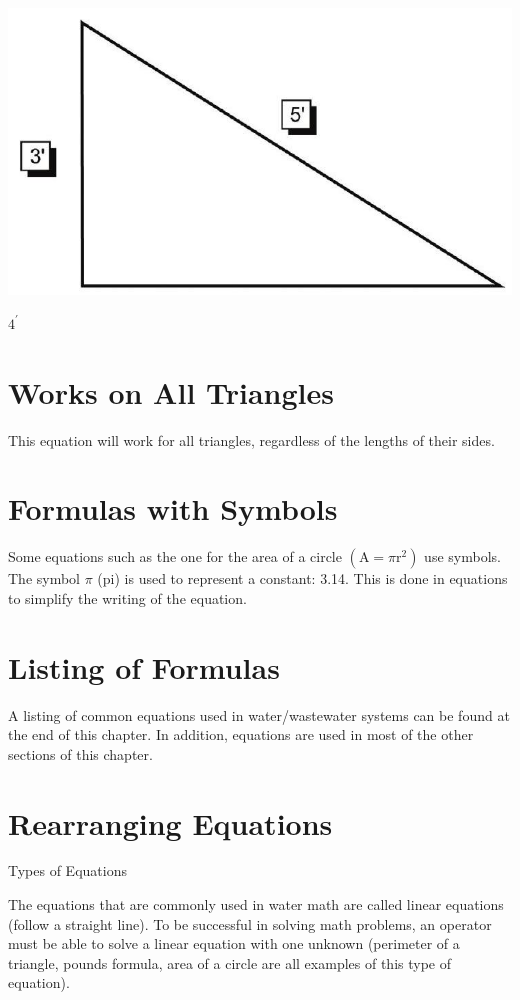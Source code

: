 \documentclass[10pt]{article}
\begin{document}
\includegraphics[max width=\textwidth]{2022_09_11_72dbedc910e6e984560cg-17(1)}

$4^{\prime}$

\section{Works on All Triangles}
This equation will work for all triangles, regardless of the lengths of their sides.

\section{Formulas with Symbols}
Some equations such as the one for the area of a circle $\left(\mathrm{A}=\pi \mathrm{r}^{2}\right)$ use symbols. The symbol $\pi$ (pi) is used to represent a constant: 3.14. This is done in equations to simplify the writing of the equation.

\section{Listing of Formulas}
A listing of common equations used in water/wastewater systems can be found at the end of this chapter. In addition, equations are used in most of the other sections of this chapter.

\section{Rearranging Equations}
Types of Equations

The equations that are commonly used in water math are called linear equations (follow a straight line). To be successful in solving math problems, an operator must be able to solve a linear equation with one unknown (perimeter of a triangle, pounds formula, area of a circle are all examples of this type of equation).
\end{document}
